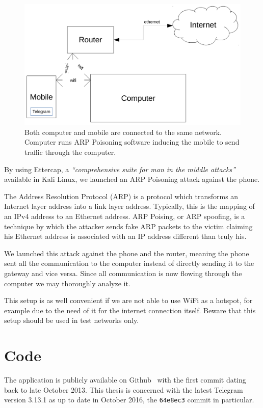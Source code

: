 \documentclass[thesis=M,english]{FITthesis}[2012/10/20]
\begin{document}
\begin{figure}[htb]
	\centering
	\includegraphics[width=1\textwidth]{setup-arp.pdf}
	\caption[Analysis setup 2]{Both computer and mobile are connected to the same network. Computer runs ARP Poisoning software inducing the mobile to send traffic through the computer.}
	\label{img:analysis-setup-arp}
\end{figure}

By using Ettercap, a \emph{``comprehensive suite for man in the middle attacks''}~\cite{ettercap-homepage} available in Kali Linux, we launched an ARP Poisoning attack against the phone.

The Address Resolution Protocol (ARP) is a protocol which transforms an Internet layer address into a link layer address. Typically, this is the mapping of an IPv4 address to an Ethernet address. ARP Poising, or ARP spoofing, is a technique by which the attacker sends fake ARP packets to the victim claiming his Ethernet address is associated with an IP address different than truly his.

We launched this attack against the phone and the router, meaning the phone sent all the communication to the computer instead of directly sending it to the gateway and vice versa. Since all communication is now flowing through the computer we may thoroughly analyze it.

This setup is as well convenient if we are not able to use WiFi as a hotspot, for example due to the need of it for the internet connection itself. Beware that this setup should be used in test networks only.

\section{Code}

The application is publicly available on Github~\cite{github-telegram} with the first commit dating back to late October 2013. This thesis is concerned with the latest Telegram version 3.13.1 as up to date in October 2016, the \texttt{64e8ec3} commit in particular.
\end{document}
